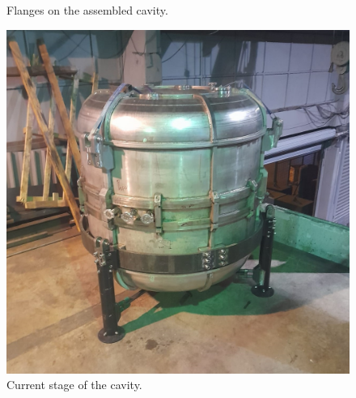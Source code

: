 \documentclass{book}
\begin{document}
\begin{figure}
    \centering
    \qquad{}%
    \vspace{20pt}
    \caption{\centering Flanges on the assembled cavity.} 
    \label{fig:manif_assembled_flanges}
\end{figure}

\begin{figure}
    \centering
    \includegraphics[width=.9\linewidth]{../../../figures/manif/assembled/rhodo_final_cropped.jpeg}
    \vspace{20pt}
    \caption{Current stage of the cavity.}
    \label{fig:manif_assembled}
\end{figure}


\end{document}
